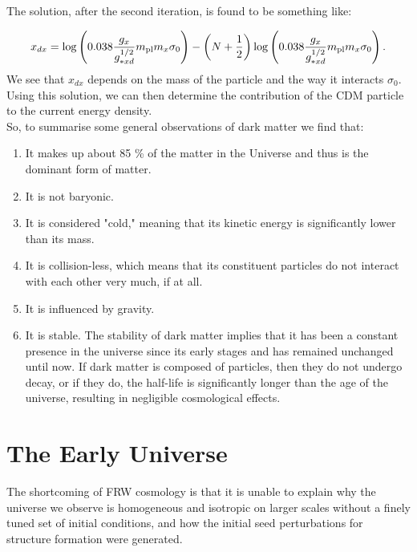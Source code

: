 The solution, after the second iteration, is found to be something like: 

\begin{align}
    x_{dx} = \log \qty(\num{.038} \frac{g_{x}}{g_{*xd}^{1/2}} m _{\text{pl}}  m_x \sigma_0 ) - \qty(N + \frac{1}{2}) \log\qty(\num{.038} \frac{g_{x}}{g_{*xd}^{1/2}} m _{\text{pl}}  m_x \sigma_0 )\,. 
\end{align}
We see that \(x_{dx}\) depends on the mass of the particle and the way it interacts \(\sigma_0 \). Using this solution, we can then determine the contribution of the CDM particle to the current energy density.\\
\hspace{0.5cm}So, to summarise some general observations of dark matter we find that:
 \begin{enumerate}
     \item  It makes up about 85 \% of the matter in the Universe and thus is the dominant form of matter.
     \item It is not baryonic.
     \item  It is considered "cold," meaning that its kinetic energy is significantly lower than its mass.
     \item It is collision-less, which means that its constituent particles do not interact with each other very much, if at all.
     \item It is influenced by gravity.
     \item It is stable. The stability of dark matter implies that it has been a constant presence in the universe since its early stages and has remained unchanged until now. If dark matter is composed of particles, then they do not undergo decay, or if they do, the half-life is significantly longer than the age of the universe, resulting in negligible cosmological effects.
 \end{enumerate}


\section{The Early Universe}
\hspace{0.5cm} The shortcoming of FRW cosmology is that it is unable to explain why the universe we observe is homogeneous and isotropic on larger scales without a finely tuned set of initial conditions, and how the initial seed perturbations for structure formation were generated.

